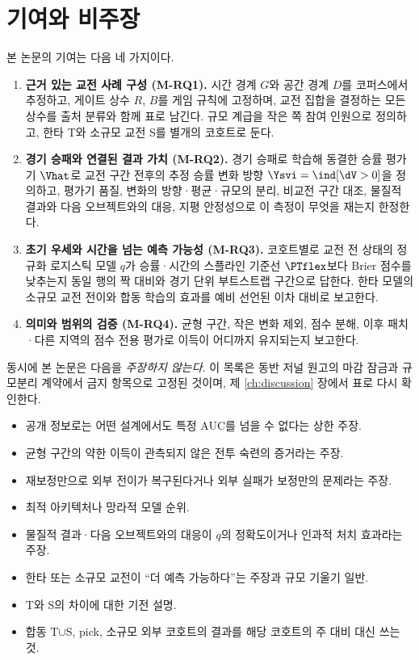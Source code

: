 \section{기여와 비주장}
\label{sec:intro-contrib}

본 논문의 기여는 다음 네 가지이다.

\begin{enumerate}[leftmargin=2em]
  \item \textbf{근거 있는 교전 사례 구성 (M-RQ1).} 시간 경계 $G$와 공간 경계 $D$를 코퍼스에서 추정하고, 게이트 상수 $R$, $B$를 게임 규칙에 고정하며, 교전 집합을 결정하는 모든 상수를 출처 분류와 함께 표로 남긴다. 규모 계급을 작은 쪽 참여 인원으로 정의하고, 한타 T와 소규모 교전 S를 별개의 코호트로 둔다.
  \item \textbf{경기 승패와 연결된 결과 가치 (M-RQ2).} 경기 승패로 학습해 동결한 승률 평가기 $\Vhat$로 교전 구간 전후의 추정 승률 변화 방향 $\Ysvi = \ind[\dV>0]$을 정의하고, 평가기 품질, 변화의 방향·평균·규모의 분리, 비교전 구간 대조, 물질적 결과와 다음 오브젝트와의 대응, 지평 안정성으로 이 측정이 무엇을 재는지 한정한다.
  \item \textbf{초기 우세와 시간을 넘는 예측 가능성 (M-RQ3).} 코호트별로 교전 전 상태의 정규화 로지스틱 모델 $q$가 승률·시간의 스플라인 기준선 $\PTflex$보다 Brier 점수를 낮추는지 동일 행의 짝 대비와 경기 단위 부트스트랩 구간으로 답한다. 한타 모델의 소규모 교전 전이와 합동 학습의 효과를 예비 선언된 이차 대비로 보고한다.
  \item \textbf{의미와 범위의 검증 (M-RQ4).} 균형 구간, 작은 변화 제외, 점수 분해, 이후 패치·다른 지역의 점수 전용 평가로 이득이 어디까지 유지되는지 보고한다.
\end{enumerate}

동시에 본 논문은 다음을 \emph{주장하지 않는다}. 이 목록은 동반 저널 원고의 마감 잠금과 규모분리 계약에서 금지 항목으로 고정된 것이며, 제 \ref{ch:discussion} 장에서 표로 다시 확인한다.

\begin{itemize}[leftmargin=1.5em]
  \item 공개 정보로는 어떤 설계에서도 특정 AUC를 넘을 수 없다는 상한 주장.
  \item 균형 구간의 약한 이득이 관측되지 않은 전투 숙련의 증거라는 주장.
  \item 재보정만으로 외부 전이가 복구된다거나 외부 실패가 보정만의 문제라는 주장.
  \item 최적 아키텍처나 망라적 모델 순위.
  \item 물질적 결과·다음 오브젝트와의 대응이 $q$의 정확도이거나 인과적 처치 효과라는 주장.
  \item 한타 또는 소규모 교전이 ``더 예측 가능하다''는 주장과 규모 기울기 일반.
  \item T와 S의 차이에 대한 기전 설명.
  \item 합동 T$\cup$S, pick, 소규모 외부 코호트의 결과를 해당 코호트의 주 대비 대신 쓰는 것.
\end{itemize}
